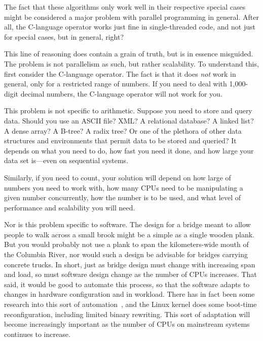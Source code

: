 The fact that these algorithms only work well in their respective special
cases might be considered a major problem with parallel programming in
general.
After all, the C-language \co{++} operator works just fine in single-threaded
code, and not just for special cases, but in general, right?

This line of reasoning does contain a grain of truth, but is in essence
misguided.
The problem is not parallelism as such, but rather scalability.
To understand this, first consider the C-language \co{++} operator.
The fact is that it does \emph{not} work in general, only for a restricted
range of numbers.
If you need to deal with 1,000-digit decimal numbers, the C-language \co{++}
operator will not work for you.

\QuickQuizEnd

This problem is not specific to arithmetic.
Suppose you need to store and query data.
Should you use an ASCII file?
XML?
A relational database?
A linked list?
A dense array?
A B-tree?
A radix tree?
Or one of the plethora of other data
structures and environments that permit data to be stored and queried?
It depends on what you need to do, how fast you need it done, and how
large your data set is---even on sequential systems.

Similarly, if you need to count, your solution will depend on how large
of numbers you need to work with, how many CPUs need to be manipulating
a given number concurrently, how the number is to be used, and what
level of performance and scalability you will need.

Nor is this problem specific to software.
The design for a bridge meant to allow people to walk across a small brook
might be a simple as a single wooden plank.
But you would probably not use a plank to span the kilometers-wide mouth of
the Columbia River, nor would such a design be advisable for bridges
carrying concrete trucks.
In short, just as bridge design must change with increasing span and load,
so must software design change as the number of CPUs increases.
That said, it would be good to automate this process, so that the
software adapts to changes in hardware configuration and in workload.
There has in fact been some research into this sort of
automation~\cite{Appavoo03a,Soules03a}, and the Linux kernel does some
boot-time reconfiguration, including limited binary rewriting.
This sort of adaptation will become increasingly important as the
number of CPUs on mainstream systems continues to increase.

